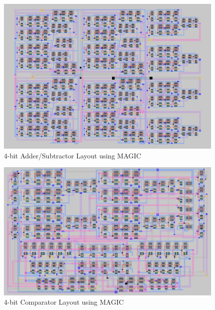 \documentclass[a4paper, titlepage]{article}
\begin{document}
\begin{figure}[htp]
    \centering
    \hypertarget{4ASM}{\includegraphics[scale = 0.5]{Image_4-bit_AS_mag.png}}
    \caption{4-bit Adder/Subtractor Layout using MAGIC}
    \label{fig:fig6}
\end{figure}
\begin{figure}[htp]
    \centering
    \hypertarget{4CM}{\includegraphics[width = \textwidth, scale = 0.7]{Image_4-bit_Comp_mag.png}}
    \caption{4-bit Comparator Layout using MAGIC}
    \label{fig:fig7}
\end{figure}
\end{document}
